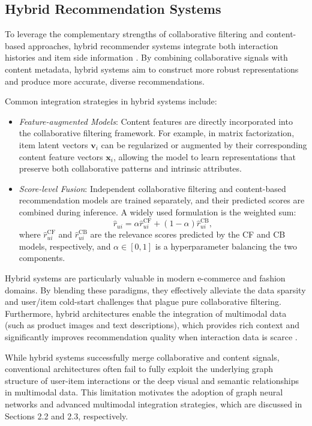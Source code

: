 \subsection{Hybrid Recommendation Systems}

To leverage the complementary strengths of collaborative filtering and content-based approaches, hybrid recommender systems integrate both interaction histories and item side information \parencite{DBLP:journals/corr/abs-2202-02757}. By combining collaborative signals with content metadata, hybrid systems aim to construct more robust representations and produce more accurate, diverse recommendations.

Common integration strategies in hybrid systems include:
\begin{itemize}
    \item \textit{Feature-augmented Models}: Content features are directly incorporated into the collaborative filtering framework. For example, in matrix factorization, item latent vectors \(\mathbf{v}_i\) can be regularized or augmented by their corresponding content feature vectors \(\mathbf{x}_i\), allowing the model to learn representations that preserve both collaborative patterns and intrinsic attributes.
    \item \textit{Score-level Fusion}: Independent collaborative filtering and content-based recommendation models are trained separately, and their predicted scores are combined during inference. A widely used formulation is the weighted sum:
    \begin{equation}
        \hat{r}_{ui} = \alpha \hat{r}_{ui}^{\text{CF}} + (1 - \alpha) \hat{r}_{ui}^{\text{CB}},
    \end{equation}
    where \(\hat{r}_{ui}^{\text{CF}}\) and \(\hat{r}_{ui}^{\text{CB}}\) are the relevance scores predicted by the CF and CB models, respectively, and \(\alpha \in [0, 1]\) is a hyperparameter balancing the two components.
\end{itemize}

Hybrid systems are particularly valuable in modern e-commerce and fashion domains. By blending these paradigms, they effectively alleviate the data sparsity and user/item cold-start challenges that plague pure collaborative filtering. Furthermore, hybrid architectures enable the integration of multimodal data (such as product images and text descriptions), which provides rich context and significantly improves recommendation quality when interaction data is scarce \parencite{10.1007/978-981-97-9616-8_3}.

While hybrid systems successfully merge collaborative and content signals, conventional architectures often fail to fully exploit the underlying graph structure of user-item interactions or the deep visual and semantic relationships in multimodal data. This limitation motivates the adoption of graph neural networks and advanced multimodal integration strategies, which are discussed in Sections 2.2 and 2.3, respectively.
